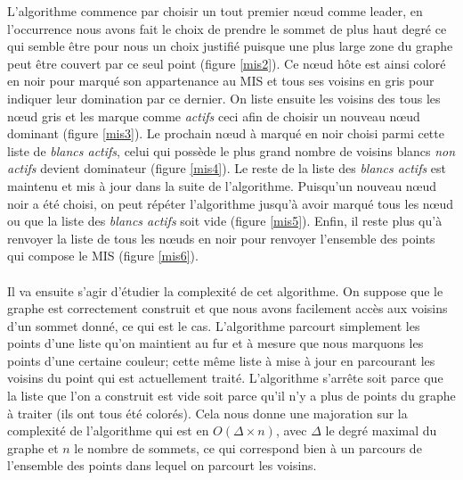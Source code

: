 \newpage
L'algorithme commence par choisir un tout premier nœud comme leader, en l'occurrence nous avons fait le choix de prendre le sommet de plus haut degré ce qui semble être pour nous un choix justifié puisque une plus large zone du graphe peut être couvert par ce seul point (figure \ref{mis2}). Ce nœud hôte est ainsi coloré en noir pour marqué son appartenance au MIS et tous ses voisins en gris pour indiquer leur domination par ce dernier. On liste ensuite les voisins des tous les nœud gris et les marque comme \textit{actifs} ceci afin de choisir un nouveau nœud dominant (figure \ref{mis3}). Le prochain nœud à marqué en noir choisi parmi cette liste de \textit{blancs actifs}, celui qui possède le plus grand nombre de voisins blancs \textit{non actifs} devient dominateur (figure \ref{mis4}). Le reste de la liste des \textit{blancs actifs} est maintenu et mis à jour dans la suite de l'algorithme. Puisqu'un nouveau nœud noir a été choisi, on peut répéter l'algorithme jusqu'à avoir marqué tous les nœud ou que la liste des \textit{blancs actifs} soit vide (figure \ref{mis5}). Enfin, il reste plus qu'à renvoyer la liste de tous les nœuds en noir pour renvoyer l'ensemble des points qui compose le MIS (figure \ref{mis6}).

\paragraph{}
Il va ensuite s'agir d'étudier la complexité de cet algorithme. On suppose que le graphe est correctement construit et que nous avons facilement accès aux voisins d'un sommet donné, ce qui est le cas. L'algorithme parcourt simplement les points d'une liste qu'on maintient au fur et à mesure que nous marquons les points d'une certaine couleur; cette même liste à mise à jour en parcourant les voisins du point qui est actuellement traité. L'algorithme s'arrête soit parce que la liste que l'on a construit est vide soit parce qu'il n'y a plus de points du graphe à traiter (ils ont tous été colorés). Cela nous donne une majoration sur la complexité de l'algorithme qui est en $O(\Delta \times n)$, avec $\Delta$ le degré maximal du graphe et $n$ le nombre de sommets, ce qui correspond bien à un parcours de l'ensemble des points dans lequel on parcourt les voisins.